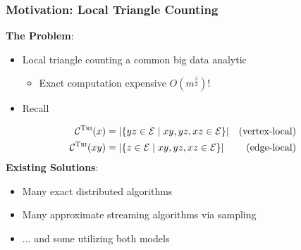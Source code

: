 \documentclass{beamer}
\newcommand{\algoname}[1]{\textnormal{\textsc{#1}}}
\begin{document}
\begin{frame}
\frametitle{Motivation: Local Triangle Counting}

\textbf{The Problem}:
\begin{itemize}
	\item Local triangle counting a common big data analytic
	\begin{itemize}
		\item Exact computation expensive $O \left ( m^{\frac{3}{2}} \right )$!
	\end{itemize}
	\item Recall
\end{itemize}
%
\vspace{-0.5em}
\begin{align*}
	\mathcal{C}^{\algoname{Tri}}(x) 
	&= |\{yz \in \mathcal{E} \mid xy, yz, xz \in \mathcal{E} \}| 
	& \textnormal{(vertex-local)} \\
	\mathcal{C}^{\algoname{Tri}}(xy) 
	&= |\{z \in \mathcal{E} \mid xy, yz, xz \in \mathcal{E} \}|
	& \textnormal{(edge-local)} 
\end{align*}
%
\textbf{Existing Solutions}:
\begin{itemize}
	\item Many exact distributed algorithms \cite{arifuzzaman2013patric, pearce2017triangle}
	\item Many approximate streaming algorithms via sampling \cite{lim2015mascot, stefani2017triest}
	\item ... and some utilizing both models \cite{shin2018tri, shin2018dislr}
\end{itemize}


\end{frame}

\end{document}
